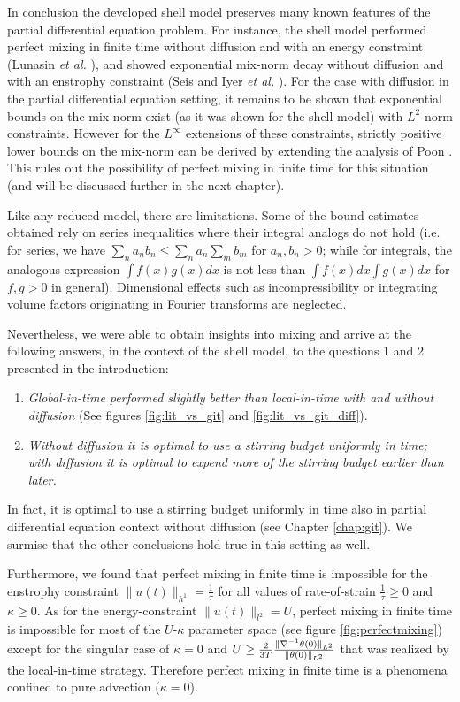 In conclusion the developed shell model preserves many known features of the partial differential equation problem. For instance, the shell model performed perfect mixing in finite time without diffusion and with an energy constraint   (Lunasin {\it et al.} \cite{JMP2012}), and showed exponential mix-norm decay without diffusion and with an enstrophy constraint  (Seis \cite{CS2013} and Iyer {\it et al.} \cite{GI2014}).  For the case with diffusion in the partial differential equation setting, it remains to be shown that exponential bounds on the mix-norm exist (as it was shown for the shell model) with $L^{2}$ norm constraints. However for the $L^{\infty}$ extensions of these constraints, strictly positive lower bounds on the mix-norm can be derived by extending the analysis of Poon \cite{Chi-Cheu1996}. This rules out the possibility of perfect mixing in finite time for this situation (and will be discussed further in the next chapter).

Like any reduced model, there are limitations. Some of the bound estimates obtained rely on series inequalities where their integral analogs do not hold  (i.e. for series, we have $\sum_{n} a_{n}b_{n} \leq \sum_{n} a_{n} \sum_{m} b_{m}$ for $a_{n},b_{n}>0$; while for integrals, the analogous expression $\int f(x)g(x) dx$ is not less than $\int  f(x) dx \int  g(x) dx$ for $f,g>0$ in general). Dimensional effects such as incompressibility or integrating volume factors originating in Fourier transforms are neglected. 

Nevertheless, we were able to obtain insights into mixing and arrive at the following answers, in the context of the shell model, to the questions 1 and 2 presented in the introduction:
 \begin{enumerate}
 \item {\it Global-in-time performed slightly better than local-in-time with and without diffusion} (See figures \ref{fig:lit_vs_git} and \ref{fig:lit_vs_git_diff}).

 \item {\it  Without diffusion it is optimal to use a stirring budget uniformly in time; with diffusion it is optimal to expend more of the stirring budget earlier than later.} 
\end{enumerate}
 In fact, it is optimal to use a stirring budget uniformly in time also in partial differential equation context without diffusion (see Chapter \ref{chap:git}). We surmise that the other conclusions hold true in this setting as well.  
 
Furthermore, we found that perfect mixing in finite time is impossible for the enstrophy constraint  $\|u(t)\|_{h^{1}}=\frac{1}{\tau}$ for all values of rate-of-strain $\frac{1}{\tau}\geq 0$ and $\kappa\geq0$. As for the energy-constraint $\|u(t)\|_{l^2}=U$, perfect mixing in finite time is impossible for most of the $U$-$\kappa$ parameter space (see figure \ref{fig:perfectmixing}) except for the singular case of $\kappa=0$ and $U\geq\frac{2}{3T}\frac{\|\nabla^{-1} \theta(0)\|_{L^{2}}}{\|\theta(0)\|_{L^{2}}}$ that was realized by the local-in-time strategy. Therefore perfect mixing in finite time is a phenomena confined to pure advection ($\kappa = 0$). 




